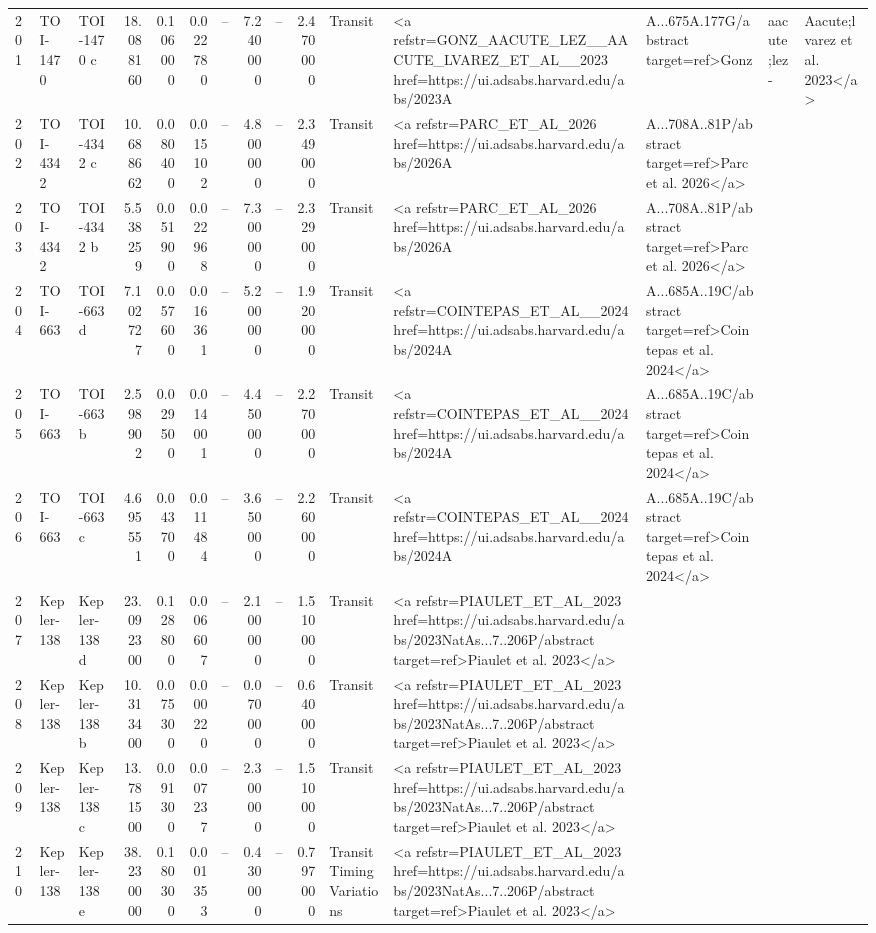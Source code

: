 \begin{tabular}{lllrrrrrrrll}
201 & TOI-1470 & TOI-1470 c & 18.088160 & 0.106000 & 0.022780 & -- & 7.240000 & -- & 2.470000 & Transit & <a refstr=GONZ_AACUTE_LEZ__AACUTE_LVAREZ_ET_AL__2023 href=https://ui.adsabs.harvard.edu/abs/2023A&A...675A.177G/abstract target=ref>Gonz&aacute;lez-&Aacute;lvarez et al. 2023</a> \\
202 & TOI-4342 & TOI-4342 c & 10.688662 & 0.080400 & 0.015102 & -- & 4.800000 & -- & 2.349000 & Transit & <a refstr=PARC_ET_AL_2026 href=https://ui.adsabs.harvard.edu/abs/2026A&A...708A..81P/abstract target=ref>Parc et al. 2026</a> \\
203 & TOI-4342 & TOI-4342 b & 5.538259 & 0.051900 & 0.022968 & -- & 7.300000 & -- & 2.329000 & Transit & <a refstr=PARC_ET_AL_2026 href=https://ui.adsabs.harvard.edu/abs/2026A&A...708A..81P/abstract target=ref>Parc et al. 2026</a> \\
204 & TOI-663 & TOI-663 d & 7.102727 & 0.057600 & 0.016361 & -- & 5.200000 & -- & 1.920000 & Transit & <a refstr=COINTEPAS_ET_AL__2024 href=https://ui.adsabs.harvard.edu/abs/2024A&A...685A..19C/abstract target=ref>Cointepas et al. 2024</a> \\
205 & TOI-663 & TOI-663 b & 2.598902 & 0.029500 & 0.014001 & -- & 4.450000 & -- & 2.270000 & Transit & <a refstr=COINTEPAS_ET_AL__2024 href=https://ui.adsabs.harvard.edu/abs/2024A&A...685A..19C/abstract target=ref>Cointepas et al. 2024</a> \\
206 & TOI-663 & TOI-663 c & 4.695551 & 0.043700 & 0.011484 & -- & 3.650000 & -- & 2.260000 & Transit & <a refstr=COINTEPAS_ET_AL__2024 href=https://ui.adsabs.harvard.edu/abs/2024A&A...685A..19C/abstract target=ref>Cointepas et al. 2024</a> \\
207 & Kepler-138 & Kepler-138 d & 23.092300 & 0.128800 & 0.006607 & -- & 2.100000 & -- & 1.510000 & Transit & <a refstr=PIAULET_ET_AL_2023 href=https://ui.adsabs.harvard.edu/abs/2023NatAs...7..206P/abstract target=ref>Piaulet et al. 2023</a> \\
208 & Kepler-138 & Kepler-138 b & 10.313400 & 0.075300 & 0.000220 & -- & 0.070000 & -- & 0.640000 & Transit & <a refstr=PIAULET_ET_AL_2023 href=https://ui.adsabs.harvard.edu/abs/2023NatAs...7..206P/abstract target=ref>Piaulet et al. 2023</a> \\
209 & Kepler-138 & Kepler-138 c & 13.781500 & 0.091300 & 0.007237 & -- & 2.300000 & -- & 1.510000 & Transit & <a refstr=PIAULET_ET_AL_2023 href=https://ui.adsabs.harvard.edu/abs/2023NatAs...7..206P/abstract target=ref>Piaulet et al. 2023</a> \\
210 & Kepler-138 & Kepler-138 e & 38.230000 & 0.180300 & 0.001353 & -- & 0.430000 & -- & 0.797000 & Transit Timing Variations & <a refstr=PIAULET_ET_AL_2023 href=https://ui.adsabs.harvard.edu/abs/2023NatAs...7..206P/abstract target=ref>Piaulet et al. 2023</a> \\

\end{tabular}
